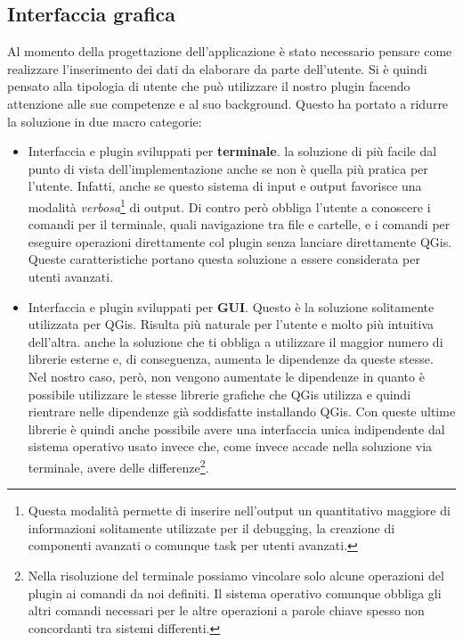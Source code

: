 \subsection{Interfaccia grafica}
Al momento della progettazione dell'applicazione è stato necessario pensare come realizzare l'inserimento dei dati da elaborare da parte dell'utente.
Si è quindi pensato alla tipologia di utente che può utilizzare il nostro plugin facendo attenzione alle sue competenze e al suo background.
Questo ha portato a ridurre la soluzione in due macro categorie:
\begin{itemize}

\item Interfaccia e plugin sviluppati per \textbf{terminale}. \egrave la soluzione di più facile dal punto di vista dell'implementazione anche se non è quella più pratica per l'utente. Infatti, anche se questo sistema di input e output favorisce una modalità \textit{verbosa}\footnote{Questa modalità permette di inserire nell'output un quantitativo maggiore di informazioni solitamente utilizzate per il debugging, la creazione di componenti avanzati o comunque task per utenti avanzati.} di output. Di contro però obbliga l'utente a conoscere i comandi per il terminale, quali navigazione tra file e cartelle, e i comandi per eseguire operazioni direttamente col plugin senza lanciare direttamente QGis. Queste caratteristiche portano questa soluzione a essere considerata per utenti avanzati.

\item Interfaccia e plugin sviluppati per \textbf{GUI}. Questo è la soluzione solitamente utilizzata per QGis. Risulta più naturale per l'utente e molto più intuitiva dell'altra. \egrave anche la soluzione che ti obbliga a utilizzare il maggior numero di librerie esterne e, di conseguenza, aumenta le dipendenze da queste stesse. Nel nostro caso, però, non vengono aumentate le dipendenze in quanto è possibile utilizzare le stesse librerie grafiche che QGis utilizza e quindi rientrare nelle dipendenze già soddisfatte installando QGis. Con queste ultime librerie è quindi anche possibile avere una interfaccia unica indipendente dal sistema operativo usato invece che, come invece accade nella soluzione via terminale, avere delle differenze\footnote{Nella risoluzione del terminale possiamo vincolare solo alcune operazioni del plugin ai comandi da noi definiti. Il sistema operativo comunque obbliga gli altri comandi necessari per le altre operazioni a parole chiave spesso non concordanti tra sistemi differenti.}.

\end{itemize}

